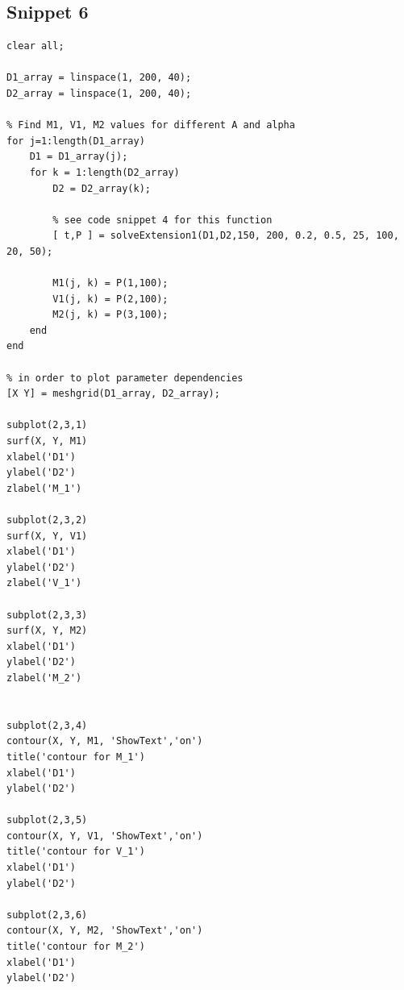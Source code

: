 \documentclass[12pt]{article}
\begin{document}
\subsection{Snippet 6}
\begin{verbatim}
clear all;

D1_array = linspace(1, 200, 40);
D2_array = linspace(1, 200, 40);

% Find M1, V1, M2 values for different A and alpha
for j=1:length(D1_array)
    D1 = D1_array(j);
    for k = 1:length(D2_array)
        D2 = D2_array(k);
        
        % see code snippet 4 for this function
        [ t,P ] = solveExtension1(D1,D2,150, 200, 0.2, 0.5, 25, 100, 20, 50);
       
        M1(j, k) = P(1,100);
        V1(j, k) = P(2,100);
        M2(j, k) = P(3,100);
    end 
end

% in order to plot parameter dependencies
[X Y] = meshgrid(D1_array, D2_array);

subplot(2,3,1)
surf(X, Y, M1)
xlabel('D1')
ylabel('D2')
zlabel('M_1')

subplot(2,3,2)
surf(X, Y, V1)
xlabel('D1')
ylabel('D2')
zlabel('V_1')

subplot(2,3,3)
surf(X, Y, M2)
xlabel('D1')
ylabel('D2')
zlabel('M_2')


subplot(2,3,4)
contour(X, Y, M1, 'ShowText','on')
title('contour for M_1')
xlabel('D1')
ylabel('D2')

subplot(2,3,5)
contour(X, Y, V1, 'ShowText','on')
title('contour for V_1')
xlabel('D1')
ylabel('D2')

subplot(2,3,6)
contour(X, Y, M2, 'ShowText','on')
title('contour for M_2')
xlabel('D1')
ylabel('D2')

\end{verbatim}
\end{document}

